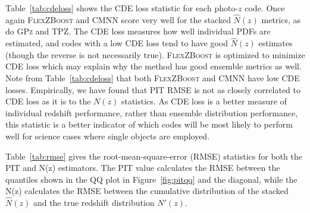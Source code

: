 Table~\ref{tab:cdeloss} shows the CDE loss statistic for each photo-$z$ code.  Once again \textsc{FlexZBoost} and \textsc{CMNN} score very well for the stacked $\hat{N}(z)$ metrics, as do \textsc{GPz} and \textsc{TPZ}.  The CDE loss measures how well individual PDFs are estimated, and codes with a low CDE loss tend to have good $\hat{N}(z)$ estimates (though the reverse is not necessarily true). \textsc{FlexZBoost} is optimized to minimize CDE loss which may explain why the method has good ensemble metrics as well. Note from Table~\ref{tab:cdeloss} that both \textsc{FlexZBoost} and \textsc{CMNN} have low CDE losses.  Empirically, we have found that PIT RMSE is not as closely correlated to CDE loss as it is to the $N(z)$ statistics.  As CDE loss is a better measure of individual redshift performance, rather than ensemble distribution performance, this statistic is a better indicator of which codes will be most likely to perform well for science cases where single objects are employed.

Table~\ref{tab:rmse} gives the root-mean-square-error (RMSE) statistics for both the PIT and N(z) estimators.  The PIT value calculates the RMSE between the quantiles shown in the QQ plot in Figure~\ref{fig:pitqq} and the diagonal, while the N(z) calculates the RMSE between the cumulative distribution of the stacked $\hat{N}(z)$ and the true redshift distribution $N'(z)$.  %

